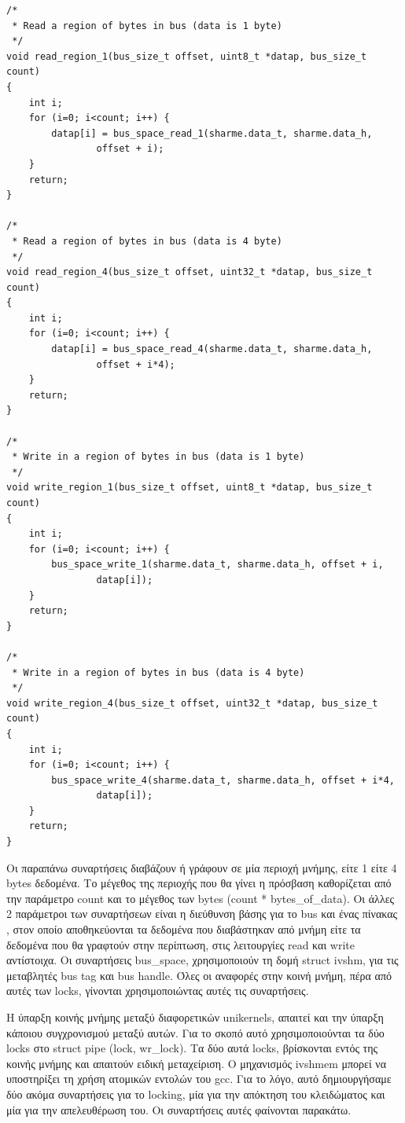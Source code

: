 \begin{lstlisting}
/*
 * Read a region of bytes in bus (data is 1 byte)
 */
void read_region_1(bus_size_t offset, uint8_t *datap, bus_size_t count)
{
	int i;
	for (i=0; i<count; i++) {
		datap[i] = bus_space_read_1(sharme.data_t, sharme.data_h,
				offset + i);
	}
	return;
}

/*
 * Read a region of bytes in bus (data is 4 byte)
 */
void read_region_4(bus_size_t offset, uint32_t *datap, bus_size_t count)
{
	int i;
	for (i=0; i<count; i++) {
		datap[i] = bus_space_read_4(sharme.data_t, sharme.data_h,
				offset + i*4);
	}
	return;
}

/*
 * Write in a region of bytes in bus (data is 1 byte)
 */
void write_region_1(bus_size_t offset, uint8_t *datap, bus_size_t count)
{
	int i;
	for (i=0; i<count; i++) {
		bus_space_write_1(sharme.data_t, sharme.data_h, offset + i,
				datap[i]);
	}
	return;
}

/*
 * Write in a region of bytes in bus (data is 4 byte)
 */
void write_region_4(bus_size_t offset, uint32_t *datap, bus_size_t count)
{
	int i;
	for (i=0; i<count; i++) {
		bus_space_write_4(sharme.data_t, sharme.data_h,	offset + i*4,
				datap[i]);
	}
	return;
}
\end{lstlisting}

Οι παραπάνω συναρτήσεις διαβάζουν ή γράφουν σε μία περιοχή μνήμης, είτε 1 είτε 4
bytes δεδομένα. Το μέγεθος της περιοχής που θα γίνει η πρόσβαση καθορίζεται από
την παράμετρο count και το μέγεθος των bytes (count * bytes\_of\_data). Οι άλλες
2 παράμετροι των συναρτήσεων είναι η διεύθυνση βάσης για το bus και ένας πίνακας
, στον οποίο αποθηκεύονται τα δεδομένα που διαβάστηκαν από μνήμη είτε τα
δεδομένα που θα γραφτούν στην περίπτωση, στις λειτουργίες read και write
αντίστοιχα. Οι συναρτήσεις bus\_space, χρησιμοποιούν τη δομή struct ivshm, για
τις μεταβλητές bus tag και bus handle. Όλες οι αναφορές στην κοινή μνήμη, πέρα
από αυτές των locks, γίνονται χρησιμοποιώντας αυτές τις συναρτήσεις.

Η ύπαρξη κοινής μνήμης μεταξύ διαφορετικών unikernels, απαιτεί και την ύπαρξη
κάποιου συγχρονισμού μεταξύ αυτών. Για το σκοπό αυτό χρησιμοποιούνται τα δύο locks
στο struct pipe (lock, wr\_lock). Τα δύο αυτά locks, βρίσκονται εντός της κοινής
μνήμης και απαιτούν ειδική μεταχείριση. Ο μηχανισμός ivshmem μπορεί να
υποστηρίξει τη χρήση ατομικών εντολών του gcc. Για το λόγο, αυτό δημιουργήσαμε
δύο ακόμα συναρτήσεις για το locking, μία για την απόκτηση του κλειδώματος και
μία για την απελευθέρωση του. Οι συναρτήσεις αυτές φαίνονται παρακάτω. 

